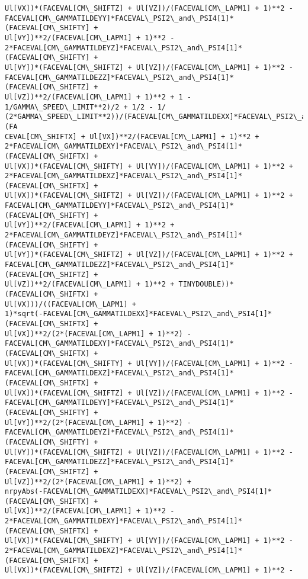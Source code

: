 \documentclass[landscape,letterpaper,10pt,english]{article}
\begin{document}
\begin{Verbatim}[commandchars=\\\{\}]
Ul[VX])*(FACEVAL[CM\_SHIFTZ] + Ul[VZ])/(FACEVAL[CM\_LAPM1] + 1)**2 -
FACEVAL[CM\_GAMMATILDEYY]*FACEVAL\_PSI2\_and\_PSI4[1]*(FACEVAL[CM\_SHIFTY] +
Ul[VY])**2/(FACEVAL[CM\_LAPM1] + 1)**2 -
2*FACEVAL[CM\_GAMMATILDEYZ]*FACEVAL\_PSI2\_and\_PSI4[1]*(FACEVAL[CM\_SHIFTY] +
Ul[VY])*(FACEVAL[CM\_SHIFTZ] + Ul[VZ])/(FACEVAL[CM\_LAPM1] + 1)**2 -
FACEVAL[CM\_GAMMATILDEZZ]*FACEVAL\_PSI2\_and\_PSI4[1]*(FACEVAL[CM\_SHIFTZ] +
Ul[VZ])**2/(FACEVAL[CM\_LAPM1] + 1)**2 + 1 - 1/GAMMA\_SPEED\_LIMIT**2)/2 + 1/2 - 1/
(2*GAMMA\_SPEED\_LIMIT**2))/(FACEVAL[CM\_GAMMATILDEXX]*FACEVAL\_PSI2\_and\_PSI4[1]*(FA
CEVAL[CM\_SHIFTX] + Ul[VX])**2/(FACEVAL[CM\_LAPM1] + 1)**2 +
2*FACEVAL[CM\_GAMMATILDEXY]*FACEVAL\_PSI2\_and\_PSI4[1]*(FACEVAL[CM\_SHIFTX] +
Ul[VX])*(FACEVAL[CM\_SHIFTY] + Ul[VY])/(FACEVAL[CM\_LAPM1] + 1)**2 +
2*FACEVAL[CM\_GAMMATILDEXZ]*FACEVAL\_PSI2\_and\_PSI4[1]*(FACEVAL[CM\_SHIFTX] +
Ul[VX])*(FACEVAL[CM\_SHIFTZ] + Ul[VZ])/(FACEVAL[CM\_LAPM1] + 1)**2 +
FACEVAL[CM\_GAMMATILDEYY]*FACEVAL\_PSI2\_and\_PSI4[1]*(FACEVAL[CM\_SHIFTY] +
Ul[VY])**2/(FACEVAL[CM\_LAPM1] + 1)**2 +
2*FACEVAL[CM\_GAMMATILDEYZ]*FACEVAL\_PSI2\_and\_PSI4[1]*(FACEVAL[CM\_SHIFTY] +
Ul[VY])*(FACEVAL[CM\_SHIFTZ] + Ul[VZ])/(FACEVAL[CM\_LAPM1] + 1)**2 +
FACEVAL[CM\_GAMMATILDEZZ]*FACEVAL\_PSI2\_and\_PSI4[1]*(FACEVAL[CM\_SHIFTZ] +
Ul[VZ])**2/(FACEVAL[CM\_LAPM1] + 1)**2 + TINYDOUBLE))*(FACEVAL[CM\_SHIFTX] +
Ul[VX]))/((FACEVAL[CM\_LAPM1] +
1)*sqrt(-FACEVAL[CM\_GAMMATILDEXX]*FACEVAL\_PSI2\_and\_PSI4[1]*(FACEVAL[CM\_SHIFTX] +
Ul[VX])**2/(2*(FACEVAL[CM\_LAPM1] + 1)**2) -
FACEVAL[CM\_GAMMATILDEXY]*FACEVAL\_PSI2\_and\_PSI4[1]*(FACEVAL[CM\_SHIFTX] +
Ul[VX])*(FACEVAL[CM\_SHIFTY] + Ul[VY])/(FACEVAL[CM\_LAPM1] + 1)**2 -
FACEVAL[CM\_GAMMATILDEXZ]*FACEVAL\_PSI2\_and\_PSI4[1]*(FACEVAL[CM\_SHIFTX] +
Ul[VX])*(FACEVAL[CM\_SHIFTZ] + Ul[VZ])/(FACEVAL[CM\_LAPM1] + 1)**2 -
FACEVAL[CM\_GAMMATILDEYY]*FACEVAL\_PSI2\_and\_PSI4[1]*(FACEVAL[CM\_SHIFTY] +
Ul[VY])**2/(2*(FACEVAL[CM\_LAPM1] + 1)**2) -
FACEVAL[CM\_GAMMATILDEYZ]*FACEVAL\_PSI2\_and\_PSI4[1]*(FACEVAL[CM\_SHIFTY] +
Ul[VY])*(FACEVAL[CM\_SHIFTZ] + Ul[VZ])/(FACEVAL[CM\_LAPM1] + 1)**2 -
FACEVAL[CM\_GAMMATILDEZZ]*FACEVAL\_PSI2\_and\_PSI4[1]*(FACEVAL[CM\_SHIFTZ] +
Ul[VZ])**2/(2*(FACEVAL[CM\_LAPM1] + 1)**2) +
nrpyAbs(-FACEVAL[CM\_GAMMATILDEXX]*FACEVAL\_PSI2\_and\_PSI4[1]*(FACEVAL[CM\_SHIFTX] +
Ul[VX])**2/(FACEVAL[CM\_LAPM1] + 1)**2 -
2*FACEVAL[CM\_GAMMATILDEXY]*FACEVAL\_PSI2\_and\_PSI4[1]*(FACEVAL[CM\_SHIFTX] +
Ul[VX])*(FACEVAL[CM\_SHIFTY] + Ul[VY])/(FACEVAL[CM\_LAPM1] + 1)**2 -
2*FACEVAL[CM\_GAMMATILDEXZ]*FACEVAL\_PSI2\_and\_PSI4[1]*(FACEVAL[CM\_SHIFTX] +
Ul[VX])*(FACEVAL[CM\_SHIFTZ] + Ul[VZ])/(FACEVAL[CM\_LAPM1] + 1)**2 -

\end{Verbatim}
\end{document}
